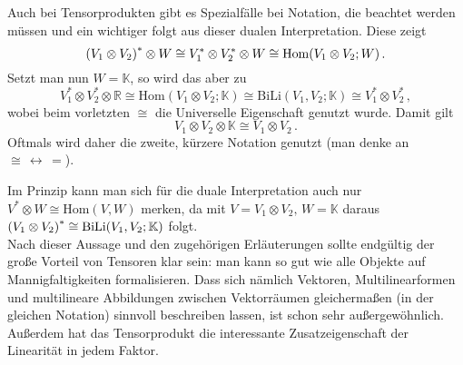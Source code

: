 \documentclass[../H_Analysis_main.tex]{subfiles}
\begin{document}


Auch bei Tensorprodukten gibt es Spezialfälle bei Notation, die beachtet werden müssen und ein wichtiger folgt aus dieser dualen Interpretation. Diese zeigt
\begin{equation*}
\qty(V_1 \otimes V_2)^* \otimes W \cong V_1^* \otimes V_2^* \otimes W \cong \text{Hom}(V_1 \otimes V_2; W) \, .
\end{equation*}
Setzt man nun $W = \mathbb{K}$, so wird das aber zu
\begin{equation*}
V_1^* \otimes V_2^* \otimes \mathbb{R} \cong \text{Hom}(V_1 \otimes V_2; \mathbb{K}) \cong \text{BiLi}(V_1, V_2; \mathbb{K}) \cong V_1^* \otimes V_2^* \, ,
\end{equation*}
wobei beim vorletzten $\cong$ die Universelle Eigenschaft genutzt wurde. Damit gilt
\begin{equation}
V_1 \otimes V_2 \otimes \mathbb{K} \cong V_1 \otimes V_2 \, .
\end{equation}
Oftmals wird daher die zweite, kürzere Notation genutzt (man denke an $\cong \, \leftrightarrow \, =$).

Im Prinzip kann man sich für die duale Interpretation auch nur $V^* \otimes W \cong \text{Hom}(V, W)$ merken, da mit $V = V_1 \otimes V_2, \, W = \mathbb{K}$ daraus $\qty(V_1 \otimes V_2)^* \cong \text{BiLi}(V_1, V_2; \mathbb{K})$ folgt.\\


Nach dieser Aussage und den zugehörigen Erläuterungen sollte endgültig der große Vorteil von Tensoren klar sein: man kann so gut wie alle Objekte auf Mannigfaltigkeiten formalisieren. Dass sich nämlich Vektoren, Multilinearformen und multilineare Abbildungen zwischen Vektorräumen gleichermaßen (in der gleichen Notation) sinnvoll beschreiben lassen, ist schon sehr außergewöhnlich. Außerdem hat das Tensorprodukt die interessante Zusatzeigenschaft der Linearität in jedem Faktor.
\end{document}
